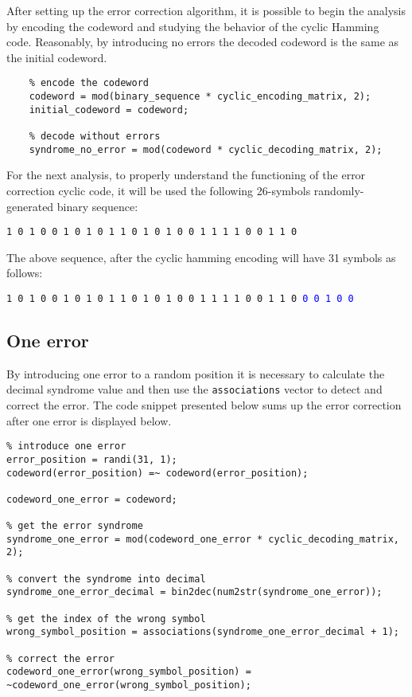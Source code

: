 \noindent After setting up the error correction algorithm, it is possible to begin the analysis by encoding the codeword and studying the behavior of the cyclic Hamming code. Reasonably, by introducing no errors the decoded codeword is the same as the initial codeword.

\begin{lstlisting} 
    % encode the codeword
    codeword = mod(binary_sequence * cyclic_encoding_matrix, 2);
    initial_codeword = codeword;
    
    % decode without errors
    syndrome_no_error = mod(codeword * cyclic_decoding_matrix, 2);
\end{lstlisting}

\noindent For the next analysis, to properly understand the functioning of the error correction cyclic code, it will be used the following 26-symbols randomly-generated binary sequence:

\begin{center}
    \texttt{1 0 1 0 0 1 0 1 0 1 1 0 1 0 1 0 0 1 1 1 1 0 0 1 1 0}
\end{center}

\noindent The above sequence, after the cyclic hamming encoding will have 31 symbols as follows:
\begin{center}
    \texttt{1 0 1 0 0 1 0 1 0 1 1 0 1 0 1 0 0 1 1 1 1 0 0 1 1 0 }\textcolor{blue}{\texttt{0 0 1 0 0}}
\end{center}

\subsection{One error}
By introducing one error to a random position it is necessary to calculate the decimal syndrome value and then use the \texttt{associations} vector to detect and correct the error. The code snippet presented below sums up the error correction after one error is displayed below.

\begin{lstlisting}
% introduce one error
error_position = randi(31, 1);
codeword(error_position) =~ codeword(error_position);

codeword_one_error = codeword;

% get the error syndrome
syndrome_one_error = mod(codeword_one_error * cyclic_decoding_matrix, 2);

% convert the syndrome into decimal
syndrome_one_error_decimal = bin2dec(num2str(syndrome_one_error));

% get the index of the wrong symbol
wrong_symbol_position = associations(syndrome_one_error_decimal + 1);

% correct the error
codeword_one_error(wrong_symbol_position) = ~codeword_one_error(wrong_symbol_position);
\end{lstlisting}

